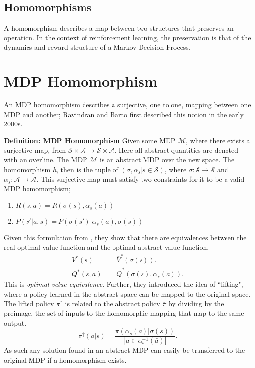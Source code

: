 \subsection{Homomorphisms}
A homomorphism describes a map between two structures that preserves an operation. In the context of reinforcement learning, the preservation is that of the dynamics and reward structure of a Markov Decision Process.

\section{MDP Homomorphism}
An MDP homomorphism describes a surjective, one to one, mapping between one MDP and another; Ravindran and Barto first described this notion in the early 2000s\cite{ravindran2003smdp,ravindran2001symmetries}.

\textbf{Definition: MDP Homomorphism} Given some MDP $\mathcal{M}$, where there exists a surjective map, from $\mathcal{S} \times \mathcal{A} \rightarrow \overline{\mathcal{S}} \times \overline{\mathcal{A}}$. Here all abstract quantities are denoted with an $\overline{\text{overline}}$. The MDP $\overline{\mathcal{M}}$  is an abstract MDP over the new space. The homomorphism $h$, then is the tuple of $(\sigma, \alpha_s|s \in \mathcal{S})$, where $\sigma: \mathcal{S} \rightarrow \overline{\mathcal{S}}$ and $\alpha_s : \mathcal{A} \rightarrow \overline{\mathcal{A}}$. This surjective map must satisfy two constraints for it to be a valid MDP homomorphism;
\begin{enumerate}
	\item $R(s, a) = R(\sigma(s), \alpha_s(a))$
	\item $P(s'| a, s) = P(\sigma(s')| \alpha_s(a), \sigma(s))$
\end{enumerate}

Given this formulation from \cite{vanderpol2020mdp}, they show that there are equivalences between the real optimal value function and the optimal abstract value function,
\begin{align*}
	V^*(s)    & = \overline{V}^*(\sigma(s)).              \\
	Q^*(s, a) & = \overline{Q}^*(\sigma(s), \alpha_s(a)).
\end{align*}
This is \textit{optimal value equivalence}. Further, they introduced the idea of ``lifting", where a policy learned in the abstract space can be mapped to the original space. The lifted policy $\pi^\uparrow$ is related to the abstract policy $\overline{\pi}$ by dividing by the preimage, the set of inputs to the homomorphic mapping that map to the same output.
\begin{equation}
	\pi^\uparrow(a | s) = \frac{\overline{\pi}(\alpha_s(a) | \sigma(s))}{| a \in \alpha^{-1}_s(\bar{a})|}.
\end{equation}
As such any solution found in an abstract MDP can easily be transferred to the original MDP if a homomorphism exists.

